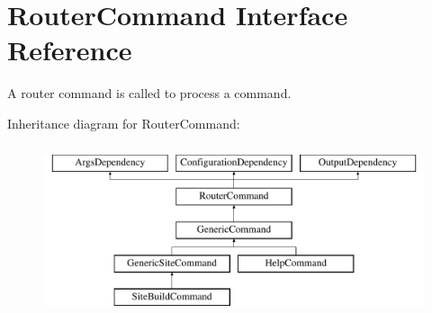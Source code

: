 \hypertarget{interfaceRouterCommand}{\section{Router\-Command Interface Reference}
\label{interfaceRouterCommand}
}


A router command is called to process a command.  


Inheritance diagram for Router\-Command\-:\begin{figure}[H]
\begin{center}
\leavevmode
\includegraphics[height=5.000000cm]{interfaceRouterCommand}
\end{center}
\end{figure}
